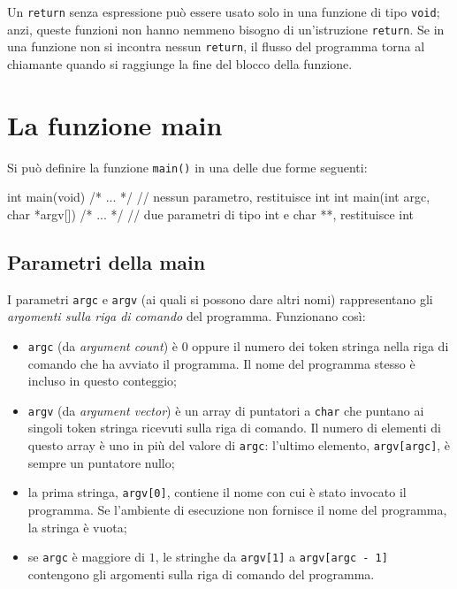 \documentclass[11pt,a4paper]{article}
\begin{document}
Un \lstinline|return| senza espressione può essere usato solo in una funzione di tipo \lstinline|void|; anzi, queste funzioni non hanno nemmeno bisogno di un'istruzione \lstinline|return|. Se in una funzione non si incontra nessun \lstinline|return|, il flusso del programma torna al chiamante quando si raggiunge la fine del blocco della funzione.

\section{La funzione main}

Si può definire la funzione \lstinline|main()| in una delle due forme seguenti:
\begin{codice}
int main(void) { /* ... */ }                  // nessun parametro, restituisce int
int main(int argc, char *argv[]) { /* ... */ } // due parametri di tipo int e char **, restituisce int
\end{codice}

\subsection{Parametri della main}

I parametri \lstinline|argc| e \lstinline|argv| (ai quali si possono dare altri nomi) rappresentano gli \emph{argomenti sulla riga di comando} del programma. Funzionano così:
\begin{itemize}
    \item \lstinline|argc| (da \emph{argument count}) è $0$ oppure il numero dei token stringa nella riga di comando che ha avviato il programma. Il nome del programma stesso è incluso in questo conteggio;
    \item \lstinline|argv| (da \emph{argument vector}) è un array di puntatori a \lstinline|char| che puntano ai singoli token stringa ricevuti sulla riga di comando. Il numero di elementi di questo array è uno in più del valore di \lstinline|argc|: l'ultimo elemento, \lstinline|argv[argc]|, è sempre un puntatore nullo;
    \item la prima stringa, \lstinline|argv[0]|, contiene il nome con cui è stato invocato il programma. Se l'ambiente di esecuzione non fornisce il nome del programma, la stringa è vuota;
    \item se \lstinline|argc| è maggiore di $1$, le stringhe da \lstinline|argv[1]| a \lstinline|argv[argc - 1]| contengono gli argomenti sulla riga di comando del programma.
\end{itemize}
\end{document}
